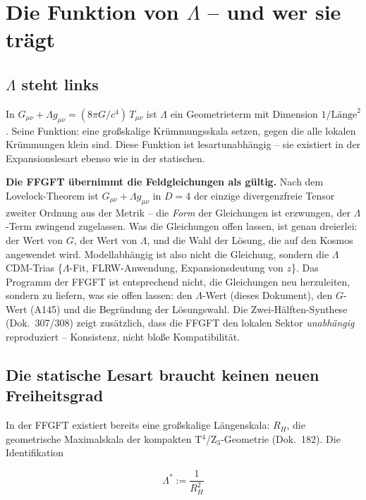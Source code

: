 \documentclass[11pt]{report}
\begin{document}
\chapter{Die Funktion von $\Lambda$ -- und wer sie trägt}

\section{$\Lambda$ steht links}

In $G_{\mu\nu} + \Lambda g_{\mu\nu} = (8\pi G/c^4)\,T_{\mu\nu}$ ist
$\Lambda$ ein Geometrieterm mit Dimension $1/\text{Länge}^2$. Seine
Funktion: eine großskalige Krümmungsskala setzen, gegen die alle
lokalen Krümmungen klein sind. Diese Funktion ist lesartunabhängig --
sie existiert in der Expansionslesart ebenso wie in der statischen.

\textbf{Die FFGFT übernimmt die Feldgleichungen als gültig.} Nach dem
Lovelock-Theorem ist $G_{\mu\nu} + \Lambda g_{\mu\nu}$ in $D=4$ der
einzige divergenzfreie Tensor zweiter Ordnung aus der Metrik -- die
\emph{Form} der Gleichungen ist erzwungen, der $\Lambda$-Term
zwingend zugelassen. Was die Gleichungen offen lassen, ist genau
dreierlei: der Wert von $G$, der Wert von $\Lambda$, und die Wahl
der Lösung, die auf den Kosmos angewendet wird. Modellabhängig ist
also nicht die Gleichung, sondern die $\Lambda$CDM-Trias
\{$\Lambda$-Fit, FLRW-Anwendung, Expansionsdeutung von $z$\}.
Das Programm der FFGFT ist entsprechend nicht, die Gleichungen neu
herzuleiten, sondern zu liefern, was sie offen lassen: den
$\Lambda$-Wert (dieses Dokument), den $G$-Wert (A145) und die
Begründung der Lösungswahl. Die Zwei-Hälften-Synthese
(Dok.~307/308) zeigt zusätzlich, dass die FFGFT den lokalen Sektor
\emph{unabhängig} reproduziert -- Konsistenz, nicht bloße
Kompatibilität.

\section{Die statische Lesart braucht keinen neuen Freiheitsgrad}

In der FFGFT existiert bereits eine großskalige Längenskala:
$R_H$, die geometrische Maximalskala der kompakten
T$^4$/Z$_3$-Geometrie (Dok.~182). Die Identifikation

\begin{equation}
  \Lambda^{*} := \frac{1}{R_H^2}
  \label{eq:def}
\end{equation}
\end{document}
